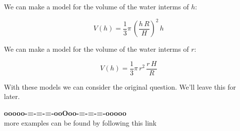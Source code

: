 \documentclass{ximera}
\begin{document}
We can make a model for the volume of the water interms of $h$:

\[  V(h) = \frac{1}{3}  \pi \, \left( \frac{h \, R}{H} \right)^2 \, h    \]



We can make a model for the volume of the water interms of $r$:

\[  V(h) = \frac{1}{3}  \pi \, r^2 \, \frac{r \, H}{R}    \]





With these models we can consider the original question.  We'll leave this for later.













\begin{center}
\textbf{\textcolor{green!50!black}{ooooo-=-=-=-ooOoo-=-=-=-ooooo}} \\

more examples can be found by following this link\\ 

\end{center}
\end{document}
